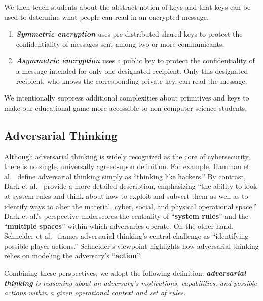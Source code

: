 \documentclass{uofithesis}
\begin{document}
We then teach students about the abstract notion of keys and that keys can be used to determine what people can read in an encrypted message.
\begin{enumerate}
    \item \textbf{\textit{Symmetric encryption}} uses pre-distributed shared keys to protect the confidentiality of messages sent among two or more communicants.
    \item  \textbf{\textit{Asymmetric encryption}} uses a public key to
    protect the confidentiality of a message intended for only one designated recipient. Only this designated recipient, who knows the corresponding private key, can read the message.
\end{enumerate}
We intentionally suppress additional complexities about primitives and keys to 
make our educational game more accessible to non-computer science students.

\subsection{Adversarial Thinking}
Although adversarial thinking is widely recognized as the core of cybersecurity, 
there is no single, universally agreed-upon definition. 
For example, Hamman et al.~\cite{hamman2016teaching} 
define adversarial thinking simply as ``thinking like hackers.'' 
By contrast, Dark et al.~\cite{AT_dark} provide a more detailed description, 
emphasizing ``the ability to look at system rules and think about how to exploit and subvert them as well as to 
identify ways to alter the material, cyber, social, and physical operational space.'' 
Dark et al.'s perspective underscores the centrality of ``\textbf{system rules}'' and the ``\textbf{multiple spaces}'' within which adversaries operate. 
On the other hand, Schneider et al.~\cite{AT_schneider} frames adversarial thinking's central challenge as ``identifying possible player actions.'' 
Schneider’s viewpoint highlights how adversarial thinking relies on modeling the adversary's ``\textbf{action}''.

Combining these perspectives, we adopt the following definition: \emph{\textbf{adversarial thinking} is reasoning about an adversary’s motivations, capabilities, and possible actions within a given 
operational context and set of rules.}
\end{document}
